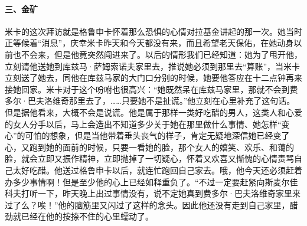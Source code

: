 \paragraph*{三、金矿}
\par 米卡的这次拜访就是格鲁申卡怀着那么恐惧的心情对拉基金讲起的那一次。她当时正等候着“消息”，庆幸米卡昨天和今天都没有来，而且希望老天保佑，在她动身以前也不会来，但是他竟突然闯进来了。以后的情形我们已经知道：她为了甩开他，立刻请他送她到库兹马·萨姆索诺夫家里去，推说她必须到那里去“算账”，当米卡立刻送了她去，同他在库兹马家的大门口分别的时候，她要他答应在十二点钟再来接她回家。米卡对于这个吩咐也很高兴：“她既然呆在库兹马家里，那就不会到费多尔·巴夫洛维奇那里去了，……只要她不是扯谎。”他立刻在心里补充了这句话。但是据他看来，大概不会是说谎。他是属于那样一类好吃醋的男人，这类人和心爱的女人分手以后，马上会造出不知道多少关于她在那里做什么事情、她怎样“变心”的可怕的想象，但是当他带着垂头丧气的样子，肯定无疑地深信她已经变了心，又跑到她的面前的时候，只要一看她的脸，那个女人的嬉笑、欢乐、和蔼的脸，就会立即又振作精神，立即抛掉了一切疑心，怀着又欢喜又惭愧的心情责骂自己太好吃醋。他送过格鲁申卡以后，就连忙跑回自己家去。哦，他今天还必须赶着办多少事情啊！但是至少他的心上已经如释重负了。“不过一定要赶紧向斯麦尔佳科夫打听一下，昨天晚上出过事情没有，说不定她真到费多尔·巴夫洛维奇家里来过了么？唉！”他的脑筋里又闪过了这样的念头。因此他还没有走到自己家里，醋劲就已经在他的按捺不住的心里蠕动了。
